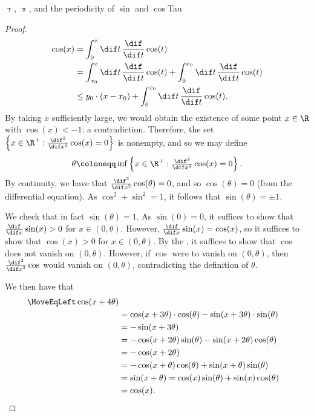 \begin{prp}{$\uptau$, $\uppi$, and the periodicity of $\sin$ and $\cos$}{Tau}
\begin{proof}
\begin{equation}
\begin{split}
\cos (x) & =\int _0^x\dif t\, \frac{\dif}{\dif t}\cos (t) \\
& =\int _{x_0}^x\dif t\, \frac{\dif}{\dif t}\cos (t)+\int _0^{x_0}\dif t\, \frac{\dif}{\dif t}\cos (t) \\
& \leq y_0\cdot (x-x_0)+\int _0^{x_0}\dif t\, \frac{\dif}{\dif t}\cos (t).
\end{split}
\end{equation}
By taking $x$ sufficiently large, we would obtain the existence of some point $x\in \R$ with $\cos (x)<-1$:  a contradiction.  Therefore, the set $\left\{ x\in \R ^+:\frac{\dif ^2}{\dif x^2}\cos (x)=0\right\}$ is nonempty, and so we may define
\begin{equation}
\theta \coloneqq \inf \left\{ x\in \R ^+:\tfrac{\dif ^2}{\dif x^2}\cos (x)=0\right\} .
\end{equation}
By continuity, we have that $\frac{\dif ^2}{\dif x^2}\cos (\theta )=0$, and so $\cos (\theta )=0$ (from the differential equation).  As $\cos ^2+\sin ^2=1$, it follows that $\sin (\theta )=\pm 1$.

We check that in fact $\sin (\theta )=1$.  As $\sin (0)=0$, it suffices to show that $\frac{\dif}{\dif x}\sin (x)>0$ for $x\in (0,\theta )$.  However, $\frac{\dif}{\dif x}\sin (x)=\cos (x)$, so it suffices to show that $\cos (x)>0$ for $x\in (0,\theta )$.  By the , it suffices to show that $\cos$ does not vanish on $(0,\theta )$.  However, if $\cos$ were to vanish on $(0,\theta )$, then $\frac{\dif ^2}{\dif x^2}\cos$ would vanish on $(0,\theta )$, contradicting the definition of $\theta$.

We then have that
\begin{equation*}
\begin{split}
\MoveEqLeft
\cos (x+4\theta ) \\
& =\cos (x+3\theta )\cdot \cos (\theta )-\sin (x+3\theta )\cdot \sin (\theta ) \\
& =-\sin (x+3\theta ) \\
& =-\cos (x+2\theta )\sin (\theta )-\sin (x+2\theta )\cos (\theta ) \\
& =-\cos (x+2\theta ) \\
& =-\cos (x+\theta )\cos (\theta )+\sin (x+\theta )\sin (\theta ) \\
& =\sin (x+\theta )=\cos (x)\sin (\theta )+\sin (x)\cos (\theta ) \\
& =\cos (x).
\end{split}
\end{equation*}


\end{proof}
\end{prp}
